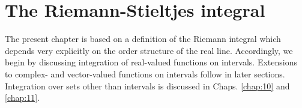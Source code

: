 \chapter{The Riemann-Stieltjes integral}
\label{chap:06}

The present chapter is based on a definition of the Riemann integral
which depends very explicitly on the order structure of the real line.
Accordingly,
we begin by discussing integration of real-valued functions on intervals.
Extensions to complex- and vector-valued functions on intervals follow in later
sections.
Integration over sets other than intervals is discussed in Chaps. \ref{chap:10} and \ref{chap:11}.







